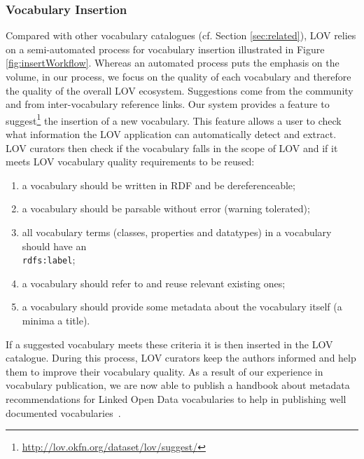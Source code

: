 \documentclass{iosart2c}
\begin{document}
	\subsubsection{Vocabulary Insertion}\label{sssec:vocabInsert} Compared with other vocabulary catalogues (cf. Section \ref{sec:related}), LOV relies on a semi-automated process for vocabulary insertion illustrated in Figure \ref{fig:insertWorkflow}. Whereas an automated process puts the emphasis on the volume, in our process, we focus on the quality of each vocabulary and therefore the quality of the overall LOV ecosystem. Suggestions come from the community and from inter-vocabulary reference links. Our system provides a feature to suggest\footnote{\url{http://lov.okfn.org/dataset/lov/suggest/}} the insertion of a new vocabulary. This feature allows a user to check what information the LOV application can automatically detect and extract. LOV curators then check if the vocabulary falls in the scope of LOV and if it meets LOV vocabulary quality requirements to be reused:
\begin{enumerate}
 \item a vocabulary should be written in RDF and be dereferenceable;
 \item a vocabulary should be parsable without error (warning tolerated);
 \item all vocabulary terms (classes, properties and datatypes) in a vocabulary should have an \\ \texttt{rdfs:label};
 \item a vocabulary should refer to and reuse relevant existing ones;
 \item a vocabulary should provide some metadata about the vocabulary itself (a minima a title).
\end{enumerate}
If a suggested vocabulary meets these criteria it is then inserted in the LOV catalogue. During this process, LOV curators keep the authors informed and help them to improve their vocabulary quality. As a result of our experience in vocabulary publication, we are now able to publish a handbook about metadata recommendations for Linked Open Data vocabularies to help in publishing well documented vocabularies~\cite{vandenbussche2011metadata}.
\end{document}
